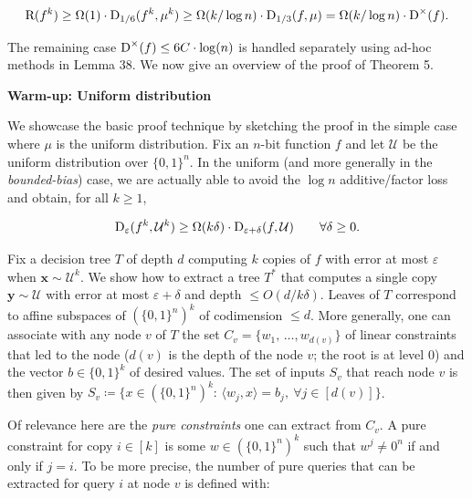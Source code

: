 \[\begin{gathered}
{\textup{R}}(f^{k})\geq\Omega(1)\cdot{\textup{D}}_{1/6}(f^{k},\mu^{k})\geq\Omega(k/\log n)\cdot{\textup{D}}_{1/3}(f,\mu)=\Omega(k/\log n)\cdot{\textup{D}}^{\times}(f).
\end{gathered}\]


The remaining case ${\textup{D}}^{\times}(f)\leq 6C\cdot\log(n)$ is handled separately using ad-hoc methods in Lemma 38. We now give an overview of the proof of Theorem 5.\par




\par\medskip\noindent\textbf{Warm-up: Uniform distribution}\par




We showcase the basic proof technique by sketching the proof in the simple case where $\mu$ is the uniform distribution.
Fix an $n$-bit function $f$ and let $\mathcal{U}$ be the uniform distribution over $\{0,1\}^{n}$. In the uniform (and more generally in the \emph{bounded-bias}) case, we are actually able to avoid the $\log n$ additive/factor loss and obtain, for all $k\geq 1$,\par


\[\begin{gathered}
{\textup{D}}_{\varepsilon}(f^{k},\mathcal{U}^{k})\geq\Omega(k\delta)\cdot{\textup{D}}_{\varepsilon+\delta}(f,\mathcal{U})\qquad\forall\delta\geq 0.
\end{gathered}\]


Fix a decision tree $T$ of depth $d$ computing $k$ copies of $f$ with error at most $\varepsilon$ when $\bm{x}\sim\mathcal{U}^{k}$. We show how to extract a tree $T^{*}$ that computes a single copy $\bm{y}\sim\mathcal{U}$ with error at most $\varepsilon+\delta$ and depth $\leq O(d/k\delta)$. Leaves of $T$ correspond to affine subspaces of $(\{0,1\}^{n})^{k}$ of codimension $\leq d$. More generally, one can associate with any node $v$ of $T$ the set $C_{v}=\{w_{1},\,\dots,w_{d(v)}\}$ of linear constraints that led to the node ($d(v)$ is the depth of the node $v$; the root is at level 0) and the vector $b\in\{0,1\}^{k}$ of desired values. The set of inputs $S_{v}$ that reach node $v$ is then given by $S_{v}\coloneqq\{x\in(\{0,1\}^{n})^{k}:\,\langle w_{j},x\rangle=b_{j},\ \forall
j\in[d(v)]\}$.\par




Of relevance here are the \emph{pure constraints} one can extract from $C_{v}$. A pure constraint for copy $i\in[k]$ is some $w\in(\{0,1\}^{n})^{k}$ such that $w^{j}\neq 0^{n}$ if and only if $j=i$. To be more precise, the number of pure queries that can be extracted for query $i$ at node $v$ is defined with:\par


